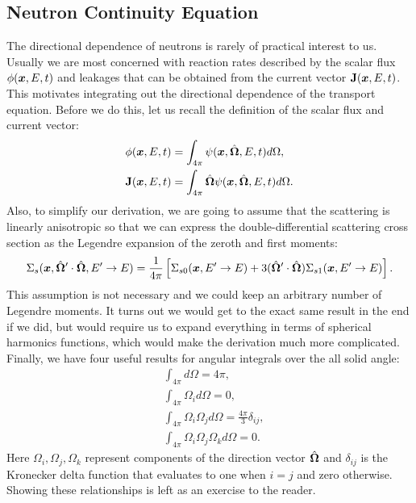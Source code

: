 \subsection{Neutron Continuity Equation}

The directional dependence of neutrons is rarely of practical interest to us. Usually we are most concerned with reaction rates described by the scalar flux $\phi(\bm{x},E,t)$ and leakages that can be obtained from the current vector $\mathbf{J}(\bm{x},E,t)$. This motivates integrating out the directional dependence of the transport equation. Before we do this, let us recall the definition of the scalar flux and current vector:
\begin{align}
  \phi(\bm{x},E,t) &= \int_{4\pi} \psi(\bm{x},\hat{\mathbf{\Omega}},E,t) d\Omega, \nonumber \\
  \mathbf{J}(\bm{x},E,t) &= \int_{4\pi} \hat{\mathbf{\Omega}} \psi(\bm{x},\hat{\mathbf{\Omega}},E,t) d\Omega. \nonumber
\end{align}
Also, to simplify our derivation, we are going to assume that the scattering is linearly anisotropic so that we can express the double-differential scattering cross section as the Legendre expansion of the zeroth and first moments:
\begin{align}
  \Sigma_{s}(\bm{x}, \hat{\mathbf{\Omega}}' \cdot \hat{\mathbf{\Omega}}, E' \rightarrow E) 
  = \frac{1}{4\pi} \left[ \Sigma_{s0} (\bm{x}, E' \rightarrow E ) + 3 ( \hat{\mathbf{\Omega}}' \cdot \hat{\mathbf{\Omega}} )  \Sigma_{s1} (\bm{x}, E' \rightarrow E ) \right] .
\end{align}
This assumption is not necessary and we could keep an arbitrary number of Legendre moments. It turns out we would get to the exact same result in the end if we did, but would require us to expand everything in terms of spherical harmonics functions, which would make the derivation much more complicated. Finally, we have four useful results for angular integrals over the all solid angle:
\begin{subequations}
\begin{align}
  &\int_{4\pi} d\Omega = 4\pi, \label{Eq:neutronics_angularIntegral_order0} \\
  &\int_{4\pi} \Omega_i d\Omega = 0, \label{Eq:neutronics_angularIntegral_order1}  \\ 
  &\int_{4\pi} \Omega_i \Omega_j d\Omega = \frac{4\pi}{3} \delta_{ij}, \label{Eq:neutronics_angularIntegral_order2}  \\ 
  &\int_{4\pi} \Omega_i \Omega_j \Omega_k d\Omega = 0.  \label{Eq:neutronics_angularIntegral_order3}  
\end{align}
\end{subequations}
Here $\Omega_i, \Omega_j, \Omega_k$ represent components of the direction vector $\hat{\mathbf{\Omega}}$ and $\delta_{ij}$ is the Kronecker delta function that evaluates to one when $i = j$ and zero otherwise. Showing these relationships is left as an exercise to the reader.

